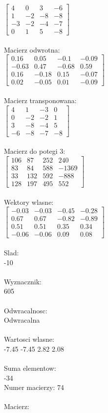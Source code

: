 \documentclass[a4paper,12pt]{article}
\begin{document}
$\begin{bmatrix} 4&0&3&-6\\1&-2&-8&-8\\-3&-2&-4&-7\\0&1&5&-8 \end{bmatrix}$
\\
\\
Macierz odwrotna:\\

$\begin{bmatrix} 0.16&0.05&-0.1&-0.09\\-0.63&0.47&-0.68&0.59\\0.16&-0.18&0.15&-0.07\\0.02&-0.05&0.01&-0.09 \end{bmatrix}$
\\
\\
Macierz transponowana:\\

$\begin{bmatrix} 4&1&-3&0\\0&-2&-2&1\\3&-8&-4&5\\-6&-8&-7&-8 \end{bmatrix}$
\\
\\
Macierz do potegi 3:\\

$\begin{bmatrix} 106&87&252&240\\83&84&588&-1369\\33&132&592&-888\\128&197&495&552 \end{bmatrix}$
\\
\\
Wektory wlasne:\\

$\begin{bmatrix} -0.03&-0.03&-0.45&-0.28\\0.67&0.67&-0.82&-0.89\\0.51&0.51&0.35&0.34\\-0.06&-0.06&0.09&0.08 \end{bmatrix}$
\\
\\
Slad:\\
-10
\\
\\
Wyznacznik:\\
605
\\
\\
Odwracalnosc:\\
Odwracalna
\\
\\
Wartosci wlasne:\\
-7.45 -7.45 2.82 2.08
\\
\\
Suma elementow:\\
-34
\\
\newpage
Numer macierzy:
74
\\
\\
Macierz:\\
\end{document}
